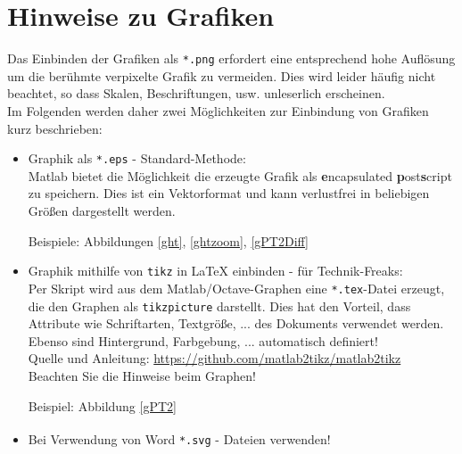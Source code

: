 \documentclass[12pt, oneside, a4paper]{scrreprt}
\begin{document}

\chapter{Hinweise zu Grafiken}

Das Einbinden der Grafiken als \texttt{*.png} erfordert eine entsprechend hohe Auflösung um die berühmte \glqq verpixelte Grafik\grqq{} zu vermeiden. Dies wird leider häufig nicht beachtet, so dass Skalen, Beschriftungen, usw. unleserlich erscheinen.\\
\newline
Im Folgenden werden daher zwei Möglichkeiten zur Einbindung von Grafiken kurz beschrieben:

\begin{itemize}

\item Graphik als \texttt{*.eps} - Standard-Methode:\\
Matlab bietet die Möglichkeit die erzeugte Grafik als \textbf{e}ncapsulated \textbf{p}ost\textbf{s}cript zu speichern. Dies ist ein Vektorformat und kann verlustfrei in beliebigen Größen dargestellt werden.\\


\vspace*{0.5cm}
Beispiele: Abbildungen \ref{ght}, \ref{ghtzoom}, \ref{gPT2Diff}
\vspace*{0.5cm}

\item Graphik mithilfe von \texttt{tikz} in LaTeX einbinden - für Technik-Freaks:\\
Per Skript wird aus dem Matlab/Octave-Graphen eine \texttt{*.tex}-Datei erzeugt, die den Graphen als \texttt{tikzpicture} darstellt. Dies hat den Vorteil, dass Attribute wie Schriftarten, Textgröße, ... des Dokuments verwendet werden. Ebenso sind Hintergrund, Farbgebung, ... automatisch definiert!\\
Quelle und Anleitung: \url{https://github.com/matlab2tikz/matlab2tikz}\\
\newline
Beachten Sie die Hinweise beim Graphen!

\vspace*{0.5cm}
Beispiel: Abbildung \ref{gPT2}
\vspace*{0.5cm}

\item Bei Verwendung von Word\textsuperscript{\texttrademark{}}  \texttt{*.svg} - Dateien verwenden!

\end{itemize}


\printbibliography

\end{document}
